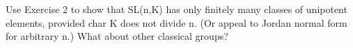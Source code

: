 Use Exercise 2 to show that SL(n,K) has only finitely many classes of unipotent elements, provided char K does not divide n. (Or appeal to Jordan normal form for arbitrary n.) What about other classical groups?
